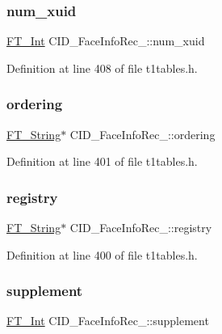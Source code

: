\subsubsection{\texorpdfstring{num\_xuid}{num\_xuid}}
{\footnotesize\ttfamily \mbox{\hyperlink{fttypes_8h_af90e5fb0d07e21be9fe6faa33f02484c}{F\+T\+\_\+\+Int}} C\+I\+D\+\_\+\+Face\+Info\+Rec\+\_\+\+::num\+\_\+xuid}



Definition at line 408 of file t1tables.\+h.

\mbox{\label{struct_c_i_d___face_info_rec___acbc231cd616375331c2c1a7bb31b2f87}} 
\subsubsection{\texorpdfstring{ordering}{ordering}}
{\footnotesize\ttfamily \mbox{\hyperlink{fttypes_8h_a9846214585359eb2ba6bbb0e6de30639}{F\+T\+\_\+\+String}}$\ast$ C\+I\+D\+\_\+\+Face\+Info\+Rec\+\_\+\+::ordering}



Definition at line 401 of file t1tables.\+h.

\mbox{\label{struct_c_i_d___face_info_rec___a7f553f371d2c960b4c46876f748f5c0d}} 
\subsubsection{\texorpdfstring{registry}{registry}}
{\footnotesize\ttfamily \mbox{\hyperlink{fttypes_8h_a9846214585359eb2ba6bbb0e6de30639}{F\+T\+\_\+\+String}}$\ast$ C\+I\+D\+\_\+\+Face\+Info\+Rec\+\_\+\+::registry}



Definition at line 400 of file t1tables.\+h.

\mbox{\label{struct_c_i_d___face_info_rec___a6d35a867d12ca9cfa6ab06cf329d0354}} 
\subsubsection{\texorpdfstring{supplement}{supplement}}
{\footnotesize\ttfamily \mbox{\hyperlink{fttypes_8h_af90e5fb0d07e21be9fe6faa33f02484c}{F\+T\+\_\+\+Int}} C\+I\+D\+\_\+\+Face\+Info\+Rec\+\_\+\+::supplement}



